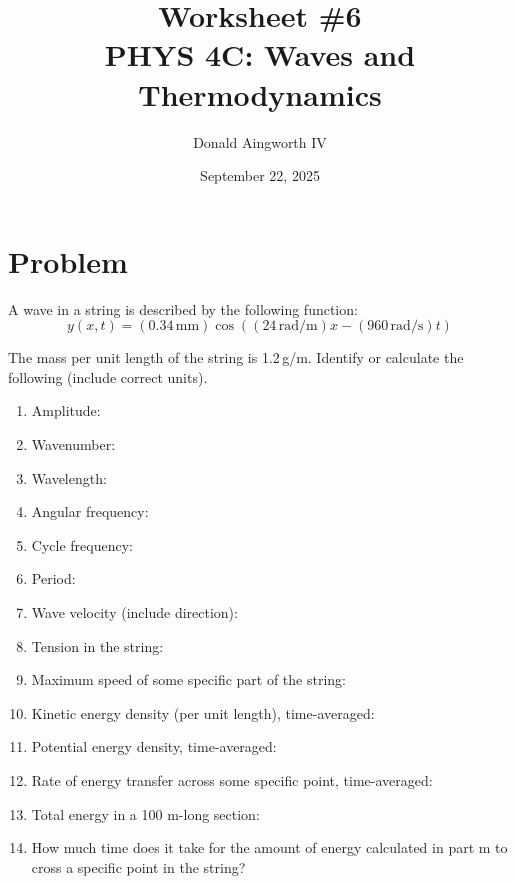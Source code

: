 \documentclass[12pt]{article}
\title{
    Worksheet \#6
    \\  \small
    PHYS 4C: Waves and Thermodynamics
    }
\author{Donald Aingworth IV}
\date{September 22, 2025}
\begin{document}

    \maketitle

    \section{Problem}
        A wave in a string is described by the following function:
        \begin{equation}
            y(x,t) = (0.34\,\unit{\milli\meter}) \cos((24\,\unit{\radian/\meter})x - (960\,\unit{\radian/\second})t)
        \end{equation}

        The mass per unit length of the string is 1.2\,\unit{\gram/\meter}.
        Identify or calculate the following (include correct units).

        \begin{enumerate}[label=\alph*)]
            \item Amplitude:
            \item Wavenumber:
            \item Wavelength:
            \item Angular frequency:
            \item Cycle frequency:
            \item Period:
            \item Wave velocity (include direction):
            \item Tension in the string:
            \item Maximum speed of some specific part of the string:
            \item Kinetic energy density (per unit length), time-averaged:
            \item Potential energy density, time-averaged:
            \item Rate of energy transfer across some specific point, time-averaged:
            \item Total energy in a 100 m-long section:
            \item How much time does it take for the amount of energy calculated in part m to cross a specific point in the string?
        \end{enumerate}
\end{document}
